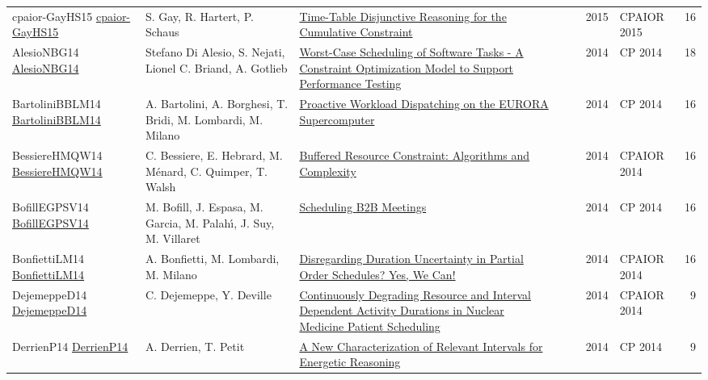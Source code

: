 {\begin{longtable}{p{3cm}p{6cm}p{7cm}rrrp{3cm}r}
cpaior-GayHS15 \href{https://doi.org/10.1007/978-3-319-18008-3\_11}{cpaior-GayHS15} & S. Gay, R. Hartert, P. Schaus & \href{papers/cpaior-GayHS15.pdf}{Time-Table Disjunctive Reasoning for the Cumulative Constraint} &  & \cite{cpaior-GayHS15} & 2015 & CPAIOR 2015 & 16\\
AlesioNBG14 \href{https://doi.org/10.1007/978-3-319-10428-7\_58}{AlesioNBG14} & Stefano {Di Alesio}, S. Nejati, Lionel C. Briand, A. Gotlieb & \href{papers/AlesioNBG14.pdf}{Worst-Case Scheduling of Software Tasks - {A} Constraint Optimization Model to Support Performance Testing} &  & \cite{AlesioNBG14} & 2014 & CP 2014 & 18\\
BartoliniBBLM14 \href{https://doi.org/10.1007/978-3-319-10428-7\_55}{BartoliniBBLM14} & A. Bartolini, A. Borghesi, T. Bridi, M. Lombardi, M. Milano & \href{papers/BartoliniBBLM14.pdf}{Proactive Workload Dispatching on the {EURORA} Supercomputer} &  & \cite{BartoliniBBLM14} & 2014 & CP 2014 & 16\\
BessiereHMQW14 \href{https://doi.org/10.1007/978-3-319-07046-9\_23}{BessiereHMQW14} & C. Bessiere, E. Hebrard, M. M{\'{e}}nard, C. Quimper, T. Walsh & \href{papers/BessiereHMQW14.pdf}{Buffered Resource Constraint: Algorithms and Complexity} &  & \cite{BessiereHMQW14} & 2014 & CPAIOR 2014 & 16\\
BofillEGPSV14 \href{https://doi.org/10.1007/978-3-319-10428-7\_56}{BofillEGPSV14} & M. Bofill, J. Espasa, M. Garcia, M. Palah{\'{\i}}, J. Suy, M. Villaret & \href{papers/BofillEGPSV14.pdf}{Scheduling {B2B} Meetings} &  & \cite{BofillEGPSV14} & 2014 & CP 2014 & 16\\
BonfiettiLM14 \href{https://doi.org/10.1007/978-3-319-07046-9\_15}{BonfiettiLM14} & A. Bonfietti, M. Lombardi, M. Milano & \href{papers/BonfiettiLM14.pdf}{Disregarding Duration Uncertainty in Partial Order Schedules? Yes, We Can!} &  & \cite{BonfiettiLM14} & 2014 & CPAIOR 2014 & 16\\
DejemeppeD14 \href{https://doi.org/10.1007/978-3-319-07046-9\_20}{DejemeppeD14} & C. Dejemeppe, Y. Deville & \href{papers/DejemeppeD14.pdf}{Continuously Degrading Resource and Interval Dependent Activity Durations in Nuclear Medicine Patient Scheduling} &  & \cite{DejemeppeD14} & 2014 & CPAIOR 2014 & 9\\
DerrienP14 \href{https://doi.org/10.1007/978-3-319-10428-7\_22}{DerrienP14} & A. Derrien, T. Petit & \href{papers/DerrienP14.pdf}{A New Characterization of Relevant Intervals for Energetic Reasoning} &  & \cite{DerrienP14} & 2014 & CP 2014 & 9\\

\end{longtable}}
